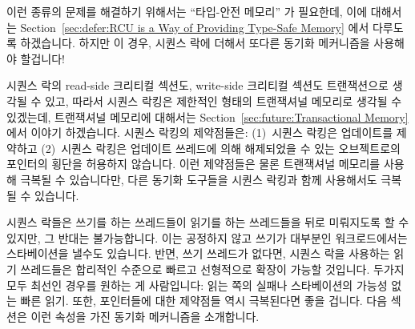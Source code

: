 {	이런 종류의 문제를 해결하기 위해서는 ``타입-안전 메모리'' 가 필요한데,
	이에 대해서는
	Section~\ref{sec:defer:RCU is a Way of Providing Type-Safe Memory} 에서
	다루도록 하겠습니다.
	하지만 이 경우, 시퀀스 락에 더해서 또다른 동기화 메커니즘을 사용해야
	할겁니다!

} \QuickQuizEnd

시퀀스 락의 read-side 크리티컬 섹션도, write-side 크리티컬 섹션도 트랜잭션으로
생각될 수 있고, 따라서 시퀀스 락킹은 제한적인 형태의 트랜잭셔널 메모리로 생각될
수 있겠는데, 트랜잭셔널 메모리에 대해서는
Section~\ref{sec:future:Transactional Memory} 에서 이야기 하겠습니다.
시퀀스 락킹의 제약점들은: (1)~시퀀스 락킹은 업데이트를 제약하고 (2)~시퀀스
락킹은 업데이트 쓰레드에 의해 해제되었을 수 있는 오브젝트로의 포인터의 횡단을
허용하지 않습니다.
이런 제약점들은 물론 트랜잭셔널 메모리를 사용해 극복될 수 있습니다만, 다른
동기화 도구들을 시퀀스 락킹과 함께 사용해서도 극복될 수 있습니다.

시퀀스 락들은 쓰기를 하는 쓰레드들이 읽기를 하는 쓰레드들을 뒤로 미뤄지도록 할
수 있지만, 그 반대는 불가능합니다.
이는 공정하지 않고 쓰기가 대부분인 워크로드에서는 스타베이션을 낼수도
있습니다.
반면, 쓰기 쓰레드가 없다면, 시퀀스 락을 사용하는 읽기 쓰레드들은 합리적인
수준으로 빠르고 선형적으로 확장이 가능할 것입니다.
두가지 모두 최선인 경우를 원하는 게 사람입니다: 읽는 쪽의 실패나 스타베이션의
가능성 없는 빠른 읽기.
또한, 포인터들에 대한 제약점들 역시 극복된다면 좋을 겁니다.
다음 섹션은 이런 속성을 가진 동기화 메커니즘을 소개합니다.

